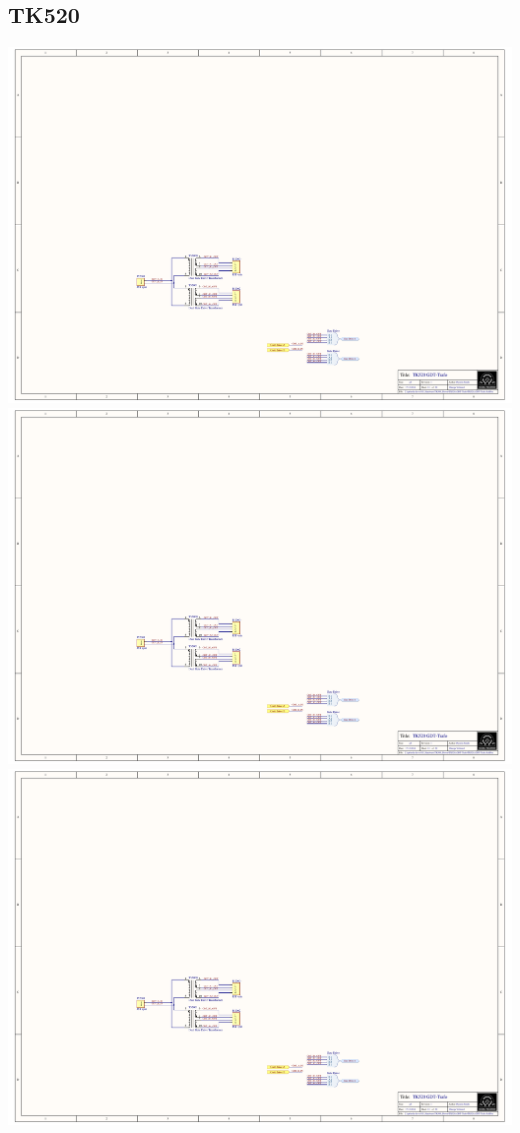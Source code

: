 \subsection{TK520}
\includegraphics[page=4,height=\textheight,width=\textwidth,keepaspectratio]{TK520_GDT-Trafo.PDF}
\includegraphics[page=5,height=\textheight,width=\textwidth,keepaspectratio]{TK520_GDT-Trafo.PDF}
\includegraphics[page=6,height=\textheight,width=\textwidth,keepaspectratio]{TK520_GDT-Trafo.PDF}
